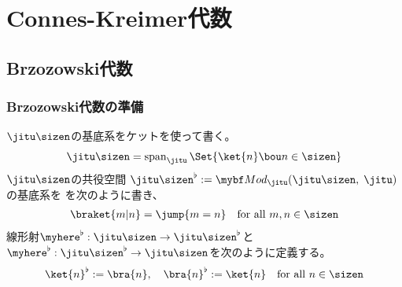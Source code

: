 {\section{Connes-Kreimer代数}\label{s1:Connes-Kreimer代数} %
\subsection{Brzozowski代数}\label{s2:Brzozowski代数} %
\subsubsection{Brzozowski代数の準備}\label{s3:Brzozowski代数の準備} %
	$\jitu\sizen$の基底系をケットを使って書く。
	\begin{equation*}\begin{split}
		\jitu\sizen = \op{span}_\jitu\Set{\ket{n}\bou n\in\sizen}
	\end{split}\end{equation*}
	$\jitu\sizen$の共役空間
	$\jitu\sizen^\flat:=\cat{Mod}_\jitu(\jitu\sizen,\;\jitu)$の基底系を
	を次のように書き、
	\begin{equation*}\begin{split}
		\braket{m|n} = \jump{m=n} \quad\text{for all } m,n\in\sizen
	\end{split}\end{equation*}
	線形射$\myhere^\flat:\jitu\sizen\to\jitu\sizen^\flat$と
	$\myhere^\flat:\jitu\sizen^\flat\to\jitu\sizen$を次のように定義する。
	\begin{equation*}\begin{split}
		\ket{n}^\flat := \bra{n},\quad \bra{n}^\flat := \ket{n}
		\quad\text{for all } n\in\sizen
	\end{split}\end{equation*}

}
